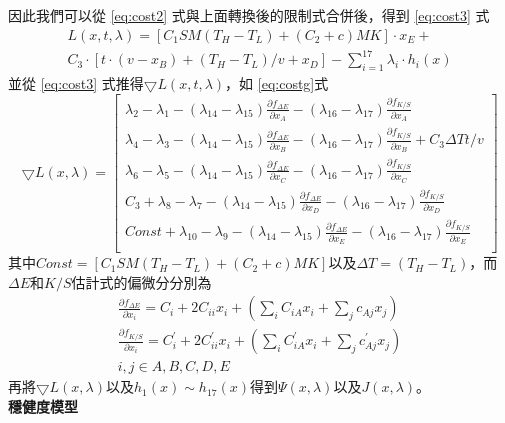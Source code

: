 因此我們可以從 \ref{eq:cost2} 式與上面轉換後的限制式合併後，得到 \ref{eq:cost3} 式
\begin{equation}
	\begin{split}
	L(x,t,\lambda)=[C_1SM(T_H-T_L)+(C_2+c)MK]\cdot x_E+\\
	C_3 \cdot [t\cdot (v-x_B) +(T_H-T_L)/v+x_D]-\sum_{i=1}^{17} \lambda_{i}\cdot h_{i}(x)
	\end{split}
\label{eq:cost3}
\end{equation}
並從 \ref{eq:cost3} 式推得$\bigtriangledown L(x,t,\lambda)$，如 \ref{eq:costg}式
\begin{equation}
\bigtriangledown L(x,\lambda)=\left[ 
	\begin{array}{c}
	\lambda_{2}-\lambda_{1}-(\lambda_{14}-\lambda_{15}) \frac{\partial f_{\Delta E}}{\partial x_{A}}-(\lambda_{16}-\lambda_{17}) \frac{\partial f_{K/S}}{\partial x_{A}} \\

	\lambda_{4}-\lambda_{3}-(\lambda_{14}-\lambda_{15}) \frac{\partial f_{\Delta E}}{\partial x_{B}}-(\lambda_{16}-\lambda_{17}) \frac{\partial f_{K/S}}{\partial x_{B}}+C_{3} \Delta T t/v \\

	\lambda_{6}-\lambda_{5}-(\lambda_{14}-\lambda_{15}) \frac{\partial f_{\Delta E}}{\partial x_{C}}-(\lambda_{16}-\lambda_{17}) \frac{\partial f_{K/S}}{\partial x_{C}} \\

	C_{3}+\lambda_{8}-\lambda_{7}-(\lambda_{14}-\lambda_{15}) \frac{\partial f_{\Delta E}}{\partial x_{D}}-(\lambda_{16}-\lambda_{17}) \frac{\partial f_{K/S}}{\partial x_{D}} \\

	Const+\lambda_{10}-\lambda_{9}-(\lambda_{14}-\lambda_{15}) \frac{\partial f_{\Delta E}}{\partial x_{E}}-(\lambda_{16}-\lambda_{17}) \frac{\partial f_{K/S}}{\partial x_{E}} \\

	\end{array}
	\right]
\label{eq:costg}
\end{equation}
其中$Const=[C_1SM(T_H-T_L)+(C_2+c)MK]$以及$\Delta T=(T_{H}-T_{L})$，而$\Delta E$和$K/S$估計式的偏微分分別為\\
\begin{equation*}
	\begin{array}{c}
		\frac{\partial f_{\Delta E}}{\partial x_{i}}=C_{i}+2C_{ii}x_{i}+(\sum_{i} C_{iA} x_{i}+\sum_{j} c_{Aj} x_{j}) \\
		\frac{\partial f_{K/S}}{\partial x_{i}}=C_{i}^{'}+2C_{ii}^{'}x_{i}+(\sum_{i} C_{iA}^{'} x_{i}+\sum_{j} c_{Aj}^{'} x_{j})\\
		i,j\in {A,B,C,D,E}
	\end{array}
\end{equation*}
再將$\bigtriangledown L(x,\lambda)$以及$h_{1}(x)\sim h_{17}(x)$得到$\Psi(x,\lambda)$以及$J(x,\lambda)$。
\\\textbf{穩健度模型}

